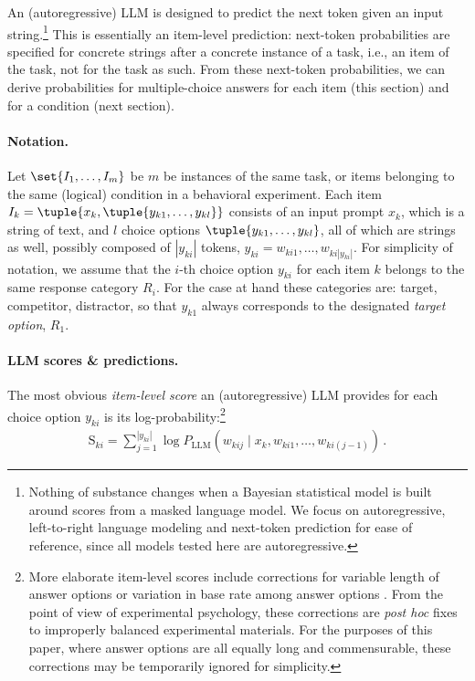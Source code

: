 \documentclass[fleqn]{article}
\begin{document}
An (autoregressive) LLM is designed to predict the next token given an input string.\footnote{
  Nothing of substance changes when a Bayesian statistical model is built around scores from a masked language model.
  We focus on autoregressive, left-to-right language modeling and next-token prediction for ease of reference, since all models tested here are autoregressive.
}
This is essentially an item-level prediction: next-token probabilities are specified for concrete strings after a concrete instance of a task, i.e., an item of the task, not for the task as such.
From these next-token probabilities, we can derive probabilities for multiple-choice answers for each item (this section) and for a condition (next section).

\paragraph{Notation.}
Let $\set{I_{1}, \dots, I_{m}}$ be $m$ be instances of the same task, or items belonging to the same (logical) condition in a behavioral experiment.
Each item $I_{k} = \tuple{x_{k}, \tuple{y_{k1}, \dots, y_{kl}}}$ consists of an input prompt $x_{k}$, which is a string of text, and $l$ choice options $\tuple{y_{k1}, \dots, y_{kl}}$, all of which are strings as well, possibly composed of $|y_{ki}|$ tokens, $y_{ki} = w_{ki1}, \dots, w_{ki|y_{ki}|}$.
For simplicity of notation, we assume that the $i$-th choice option $y_{ki}$ for each item $k$ belongs to the same response category $R_{i}$.
For the case at hand these categories are: target, competitor, distractor, so that $y_{k1}$ always corresponds to the designated \emph{target option}, $R_{1}$.

\paragraph{LLM scores \& predictions.}
The most obvious \emph{item-level score} an (autoregressive) LLM provides for each choice option $y_{ki}$ is its log-probability:\footnote{
  More elaborate item-level scores include corrections for variable length of answer options \citep[e.g.,][]{BrownMann2020:Language-Models} or variation in base rate among answer options \citep[e.g.,][]{HoltzmanWest2021:Surface-Form-Co}.
  From the point of view of experimental psychology, these corrections are \emph{post hoc} fixes to improperly balanced experimental materials.
  For the purposes of this paper, where answer options are all equally long and commensurable, these corrections may be temporarily ignored for simplicity.
}
%
\begin{align*}
  \text{S}_{ki}
  =  \sum_{j=1}^{|y_{ki}|} \log P_{\text{LLM}} \left(w_{kij} \mid x_{k}, w_{ki1}, \dots, w_{ki(j-1)} \right)  \,.
\end{align*}
%
\end{document}
